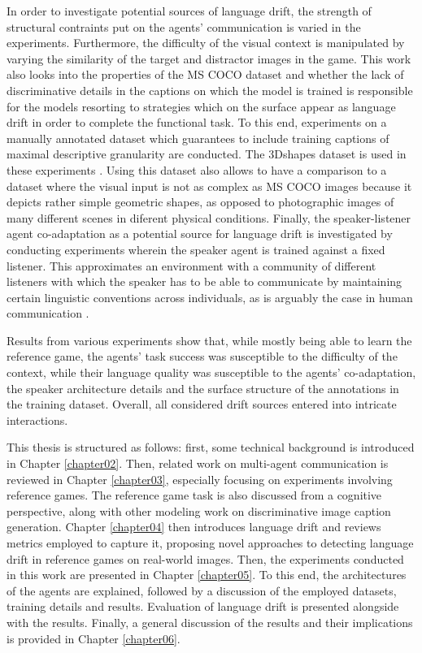 In order to investigate potential sources of language drift, the strength of structural contraints put on the agents' communication is varied in the experiments. Furthermore, the difficulty of the visual context is manipulated by varying the similarity of the target and distractor images in the game. This work also looks into the properties of the MS COCO dataset and whether the lack of discriminative details in the captions on which the model is trained is responsible for the models resorting to strategies which on the surface appear as language drift in order to complete the functional task. To this end, experiments on a manually annotated dataset which guarantees to include training captions of maximal descriptive granularity are conducted. The 3Dshapes dataset is used in these experiments \parencite{burgess20183d}. Using this dataset also allows to have a comparison to a dataset where the visual input is not as complex as MS COCO images because it depicts rather simple geometric shapes, as opposed to photographic images of many different scenes in diferent physical conditions. Finally, the speaker-listener agent co-adaptation as a potential source for language drift is investigated by conducting experiments wherein the speaker agent is trained against a fixed listener. This approximates an environment with a community of different listeners with which the speaker has to be able to communicate by maintaining certain linguistic conventions across individuals, as is arguably the case in human communication \parencite{kirby2014iterated, clark1991grounding}. 

Results from various experiments show that, while mostly being able to learn the reference game, the agents' task success was susceptible to the difficulty of the context, while their language quality was susceptible to the agents' co-adaptation, the speaker architecture details and the surface structure of the annotations in the training dataset. Overall, all considered drift sources entered into intricate interactions.

This thesis is structured as follows: first, some technical background is introduced in Chapter \ref{chapter02}. Then, related work on multi-agent communication is reviewed in Chapter \ref{chapter03}, especially focusing on experiments involving reference games. The reference game task is also discussed from a cognitive perspective, along with other modeling work on discriminative image caption generation. Chapter \ref{chapter04} then introduces language drift and reviews metrics employed to capture it, proposing novel approaches to detecting language drift in reference games on real-world images. Then, the experiments conducted in this work are presented in Chapter \ref{chapter05}. To this end, the architectures of the agents are explained, followed by a discussion of the employed datasets, training details and results. Evaluation of language drift is presented alongside with the results. Finally, a general discussion of the results and their implications is provided in Chapter \ref{chapter06}. %

